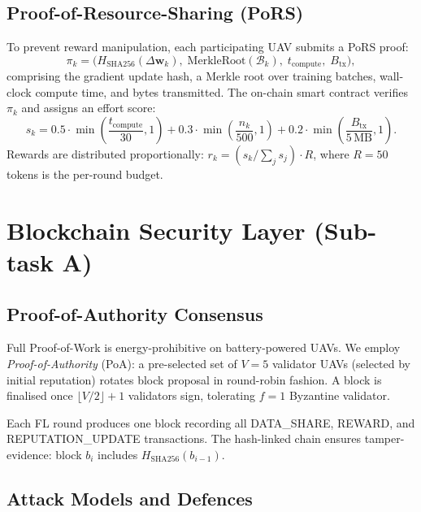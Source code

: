 \documentclass[12pt,a4paper]{article}
\begin{document}
\subsection{Proof-of-Resource-Sharing (PoRS)}

To prevent reward manipulation, each participating UAV submits a PoRS proof:
\begin{equation}
  \pi_k = \bigl(
    H_{\mathrm{SHA256}}(\Delta\mathbf{w}_k),\;
    \mathrm{MerkleRoot}(\mathcal{B}_k),\;
    t_{\mathrm{compute}},\;
    B_{\mathrm{tx}}
  \bigr),
\end{equation}
comprising the gradient update hash, a Merkle root over training batches,
wall-clock compute time, and bytes transmitted.  The on-chain smart contract
verifies $\pi_k$ and assigns an effort score:
\begin{equation}
  s_k = 0.5 \cdot \min\!\left(\frac{t_{\mathrm{compute}}}{30},1\right)
       + 0.3 \cdot \min\!\left(\frac{n_k}{500},1\right)
       + 0.2 \cdot \min\!\left(\frac{B_{\mathrm{tx}}}{5\,\text{MB}},1\right).
\end{equation}
Rewards are distributed proportionally: $r_k = (s_k / \sum_j s_j) \cdot R$,
where $R = 50$ tokens is the per-round budget.

\section{Blockchain Security Layer (Sub-task A)}

\subsection{Proof-of-Authority Consensus}

Full Proof-of-Work is energy-prohibitive on battery-powered UAVs.  We employ
\emph{Proof-of-Authority} (PoA): a pre-selected set of $V = 5$ validator UAVs
(selected by initial reputation) rotates block proposal in round-robin fashion.
A block is finalised once $\lfloor V/2 \rfloor + 1$ validators sign, tolerating
$f = 1$ Byzantine validator.

Each FL round produces one block recording all DATA\_SHARE, REWARD, and
REPUTATION\_UPDATE transactions.  The hash-linked chain ensures tamper-evidence:
block $b_i$ includes $H_{\mathrm{SHA256}}(b_{i-1})$.

\subsection{Attack Models and Defences}
\end{document}
